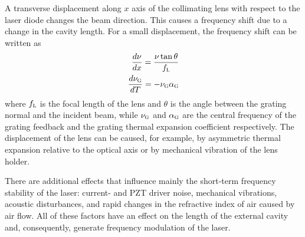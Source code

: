 A transverse displacement along $x$ axis of the collimating lens with respect to the laser diode changes the beam direction. This causes a frequency shift due to a change in the cavity length. For a small displacement, the frequency shift can be written as
\begin{align}
\frac{d\nu}{dx}=\frac{\nu\tan\theta}{f_{\mbox{\footnotesize{\scshape{l}}}}}
\label{displacement}\\
\frac{d\nu_{\mbox{\footnotesize{\scshape{g}}}}}{dT}=-\nu_{\mbox{\footnotesize{\scshape{g}}}}\alpha_{\mbox{\footnotesize{\scshape{g}}}}
\label{displacement2}
\end{align}
where $f_{\mbox{\footnotesize{\scshape{l}}}}$ is the focal length of the lens and $\theta$ is the angle between the grating normal and the incident beam, while $\nu_{\mbox{\footnotesize{\scshape{g}}}}$ and $\alpha_{\mbox{\footnotesize{\scshape{g}}}}$ are the central frequency of the grating feedback and the grating thermal expansion coefficient respectively. The displacement of the lens can be caused, for example, by asymmetric thermal expansion relative to the optical axis or by mechanical vibration of the lens holder. 

There are additional effects that influence mainly the short-term frequency stability of the laser: current- and PZT driver noise, mechanical vibrations, acoustic disturbances, and rapid changes in the refractive index of air caused by air flow. All of these factors have an effect on the length of the external cavity and, consequently, generate frequency modulation of the laser.